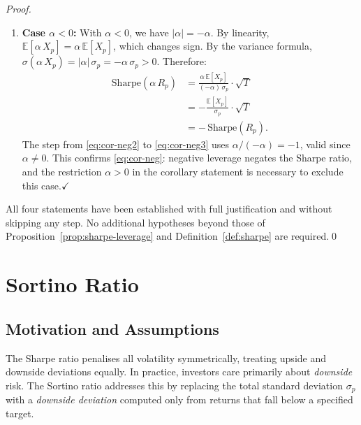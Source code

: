 \documentclass[12pt,openany]{book}
\newcommand{\E}{\mathbb{E}}
\numberwithin{equation}{chapter}
\theoremstyle{plain}
\theoremstyle{definition}
\theoremstyle{remark}
\numberwithin{equation}{chapter}
\theoremstyle{plain}
\begin{document}
\begin{proof}
\begin{enumerate}
\begin{enumerate}
          \item \textbf{Case $\alpha < 0$:}
                With $\alpha < 0$, we have $|\alpha| = -\alpha$.
                By linearity, $\E[\alpha\,X_p]
                = \alpha\,\E[X_p]$, which changes sign.
                By the variance formula,
                $\sigma(\alpha\,X_p) = |\alpha|\,\sigma_p
                = -\alpha\,\sigma_p > 0$.  Therefore:
                \begin{align}
                  \mathrm{Sharpe}(\alpha\,R_p)
                    &= \frac{\alpha\,\E[X_p]}
                            {(-\alpha)\,\sigma_p}
                       \cdot\sqrt{T}
                  \label{eq:cor-neg2} \\
                    &= -\frac{\E[X_p]}{\sigma_p}
                       \cdot\sqrt{T}
                  \label{eq:cor-neg3} \\
                    &= -\,\mathrm{Sharpe}(R_p).
                  \label{eq:cor-neg4}
                \end{align}
                The step from \eqref{eq:cor-neg2} to
                \eqref{eq:cor-neg3} uses $\alpha/(-\alpha)
                = -1$, valid since $\alpha \neq 0$.
                This confirms \eqref{eq:cor-neg}: negative
                leverage negates the Sharpe ratio, and the
                restriction $\alpha > 0$ in the corollary
                statement is necessary to exclude this
                case.\hfill$\checkmark$
        \end{enumerate}
\end{enumerate}

\noindent
All four statements have been established with full
justification and without skipping any step.  No additional
hypotheses beyond those of
Proposition~\ref{prop:sharpe-leverage} and
Definition~\ref{def:sharpe} are required.\qed
\end{proof}

\section{Sortino Ratio}

\subsection{Motivation and Assumptions}

\noindent
The Sharpe ratio penalises all volatility symmetrically, treating
upside and downside deviations equally.  In practice, investors care
primarily about \emph{downside} risk.  The Sortino ratio addresses
this by replacing the total standard deviation $\sigma_p$ with a
\emph{downside deviation} computed only from returns that fall below
a specified target.
\end{document}
